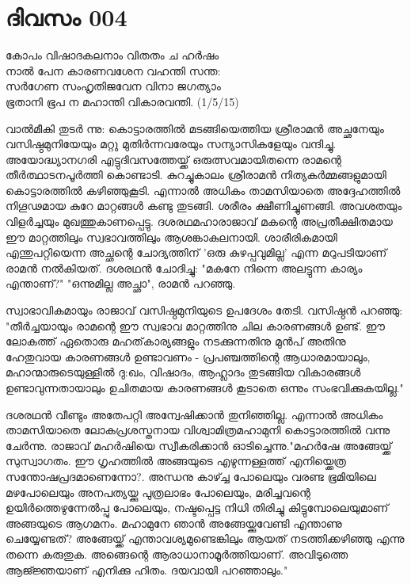  
\section{ദിവസം 004}

\begin{center}
കോപം വിഷാദകലനാം വിതതം ച ഹർഷം\\
നാൽ പേന കാരണവശേന വഹന്തി സന്ത:\\
സർഗേണ സംഹൃതിജവേന വിനാ ജഗത്യാം \\
ഭൂതാനി ഭൂപ ന മഹാന്തി വികാരവന്തി. (1/5/15)\\
\end{center}

വാല്‍മീകി തുടര്‍ ന്നു: കൊട്ടാരത്തില്‍ മടങ്ങിയെത്തിയ ശ്രീരാമന്‍ അച്ഛനേയും വസിഷ്ഠമുനിയേയും മറ്റു മുതിര്‍ന്നവരേയും സന്യാസികളേയും വന്ദിച്ചു. അയോദ്ധ്യാനഗരി എട്ടുദിവസത്തേയ്ക്ക്‌ ഒരുത്സവമായിതന്നെ രാമന്റെ തീര്‍ത്ഥാടനപൂര്‍ത്തി കൊണ്ടാടി. കുറച്ചുകാലം ശ്രീരാമന്‍ നിത്യകര്‍മ്മങ്ങളുമായി കൊട്ടാരത്തില്‍ കഴിഞ്ഞുകൂടി. എന്നാല്‍ അധികം താമസിയാതെ അദ്ദേഹത്തില്‍ നിഗൂഢമായ കുറേ മാറ്റങ്ങള്‍ കണ്ടു തുടങ്ങി. ശരീരം ക്ഷീണിച്ചുണങ്ങി. അവശതയും വിളര്‍ച്ചയും മുഖത്തുകാണപ്പെട്ടു. ദശരഥമഹാരാജാവ്‌ മകന്റെ അപ്രതീക്ഷിതമായ ഈ മാറ്റത്തിലും സ്വഭാവത്തിലും ആശങ്കാകുലനായി. ശാരീരികമായി എന്തുപറ്റിയെന്ന അച്ഛന്റെ ചോദ്യത്തിന്‌ 'ഒരു കുഴപ്പവുമില്ല' എന്ന മറുപടിയാണ്‌ രാമന്‍ നല്‍കിയത്‌. ദശരഥന്‍ ചോദിച്ചു: "മകനേ നിന്നെ അലട്ടുന്ന കാര്യം എന്താണ്‌?" "ഒന്നുമില്ല അച്ഛാ", രാമന്‍ പറഞ്ഞു. 


സ്വാഭാവികമായും രാജാവ്‌ വസിഷ്ഠമുനിയുടെ ഉപദേശം തേടി. വസിഷ്ഠന്‍ പറഞ്ഞു: "തീര്‍ച്ചയായും രാമന്റെ ഈ സ്വഭാവ മാറ്റത്തിനു ചില കാരണങ്ങള്‍ ഉണ്ട്‌. ഈ ലോകത്ത്‌ ഏതൊരു മഹത്‌കാര്യങ്ങളും നടക്കുന്നതിനു മുന്‍പ്‌ അതിനു ഹേതുവായ കാരണങ്ങള്‍ ഉണ്ടാവണം - പ്രപഞ്ചത്തിന്റെ ആധാരമായാലും, മഹാന്മാരുടെയുള്ളില്‍ ദു:ഖം, വിഷാദം, ആഹ്ലാദം തുടങ്ങിയ വികാരങ്ങള്‍ ഉണ്ടാവുന്നതായാലും ഉചിതമായ കാരണങ്ങള്‍ കൂടാതെ ഒന്നും സംഭവിക്കുകയില്ല."

ദശരഥന്‍ വീണ്ടും അതേപറ്റി അന്വേഷിക്കാന്‍ തുനിഞ്ഞില്ല. എന്നാല്‍ അധികം താമസിയാതെ ലോകപ്രശസ്തനായ വിശ്വാമിത്രമഹാമുനി കൊട്ടാരത്തില്‍ വന്നു ചേര്‍ന്നു. രാജാവ്‌ മഹര്‍ഷിയെ സ്വീകരിക്കാന്‍ ഓടിച്ചെന്നു."മഹര്‍ഷേ അങ്ങേയ്ക്ക്‌ സുസ്വാഗതം. ഈ ഗൃഹത്തില്‍ അങ്ങയുടെ എഴുന്നള്ളത്ത്‌ എനിയ്ക്കെത്ര സന്തോഷപ്രദമാണെന്നോ?. അന്ധനു കാഴ്ച്ച പോലെയും വരണ്ട ഭൂമിയിലെ മഴപോലെയും അനപത്യയ്ക്കു പുത്രലാഭം പോലെയും, മരിച്ചവന്റെ ഉയിര്‍ത്തെഴുന്നേല്‍പ്പു പോലെയും, നഷ്ടപ്പെട്ട നിധി തിരിച്ചു കിട്ടുമ്പോലെയുമാണ്‌ അങ്ങയുടെ ആഗമനം. മഹാമുനേ ഞാന്‍ അങ്ങേയ്ക്കുവേണ്ടി എന്താണു ചെയ്യേണ്ടത്‌? അങ്ങേയ്ക്ക്‌ എന്താവശ്യമുണ്ടെങ്കിലും ആയത്‌ നടത്തിക്കഴിഞ്ഞു എന്നു തന്നെ കരുതുക. അങ്ങെന്റെ ആരാധാനാമൂര്‍ത്തിയാണ്‌. അവിടുത്തെ ആജ്ജ്ഞയാണ്‌ എനിക്കു ഹിതം. ദയവായി പറഞ്ഞാലും."
